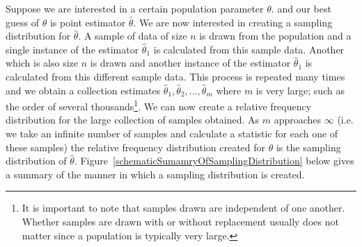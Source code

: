 Suppose we are interested in a certain population parameter $\theta$.
and our best guess of $\theta$ is point estimator $\hat{\theta}$.
We are now interested in creating a sampling distribution for $\hat{\theta}$.
A sample of data of size $n$ is drawn from the population and a single instance of the estimator $\hat{\theta}_{1}$ is calculated from this sample data.
Another  which is also size $n$ is drawn and another instance of the estimator $\hat{\theta}_{1}$ is calculated from this different sample data.
This process is repeated many times and we obtain a collection estimates
 $\hat{\theta}_{1}, \hat{\theta}_{2}, \ldots, \hat{\theta}_{m}$ where $m$ is very large; such as the order of several thousands\footnote{It is important to note that samples drawn are independent of one another. Whether samples are drawn with or without replacement usually does not matter since a population is typically very large.}.
We can now create a relative frequency distribution for the large collection of samples obtained.  
As $m$ approaches $\infty$ (i.e. we take an infinite number of samples and calculate a statistic for each one of these samples) the relative frequency distribution created for $\hat{\theta}$ 
is the sampling distribution of $\hat{\theta}$.
Figure~\ref{schematicSumamryOfSamplingDistribution} below gives
a summary of the manner in which a sampling distribution is created.


